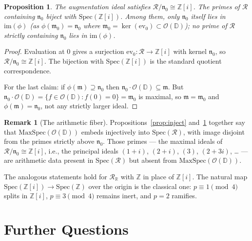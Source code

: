 \documentclass[12pt]{amsart}
\newtheorem{proposition}[theorem]{Proposition}
\theoremstyle{definition}
\newtheorem{remark}[theorem]{Remark}
\newcommand{\D}{\mathbb{D}}
\newcommand{\Z}{\mathbb{Z}}
\newcommand{\Zi}{\mathbb{Z}[i]}
\newcommand{\OD}{\mathcal{O}(\D)}
\newcommand{\mR}{\mathcal{R}}
\newcommand{\mRR}{\mathcal{R}_{\mathbb{R}}}
\begin{document}
\begin{proposition}
\label{prop:fiber}
The augmentation ideal satisfies $\mR/\mathfrak{n}_0 \cong \Zi$.  The
primes of $\mR$ containing $\mathfrak{n}_0$ biject with
$\mathrm{Spec}(\Zi)$.  Among them, only $\mathfrak{n}_0$ itself lies
in $\mathrm{im}(\phi)$ (as $\phi(\mathfrak{m}_0) = \mathfrak{n}_0$
where $\mathfrak{m}_0 = \ker(\mathrm{ev}_0) \subset \OD$); no prime
of $\mR$ strictly containing $\mathfrak{n}_0$ lies in $\mathrm{im}(\phi)$.
\end{proposition}

\begin{proof}
Evaluation at $0$ gives a surjection $\mathrm{ev}_0\colon\mR \to \Zi$
with kernel $\mathfrak{n}_0$, so $\mR/\mathfrak{n}_0 \cong \Zi$.  The
bijection with $\mathrm{Spec}(\Zi)$ is the standard quotient correspondence.

For the last claim: if $\phi(\mathfrak{m}) \supseteq \mathfrak{n}_0$
then $\mathfrak{n}_0 \cdot \OD \subseteq \mathfrak{m}$.  But
$\mathfrak{n}_0 \cdot \OD = \{f \in \OD : f(0)=0\} = \mathfrak{m}_0$
is maximal, so $\mathfrak{m} = \mathfrak{m}_0$ and
$\phi(\mathfrak{m}) = \mathfrak{n}_0$, not any strictly larger ideal.
\end{proof}

\begin{remark}[The arithmetic fiber]
\label{rem:fiber}
Propositions~\ref{prop:inject} and~\ref{prop:fiber} together say that
$\mathrm{MaxSpec}(\OD)$ embeds injectively into $\mathrm{Spec}(\mR)$,
with image disjoint from the primes strictly above $\mathfrak{n}_0$.
Those primes — the maximal ideals of $\mR/\mathfrak{n}_0 \cong \Zi$,
i.e., the principal ideals $(1+i)$, $(2+i)$, $(3)$, $(2+3i)$, \ldots
— are arithmetic data present in $\mathrm{Spec}(\mR)$ but absent from
$\mathrm{MaxSpec}(\OD)$.

The analogous statements hold for $\mRR$ with $\Z$ in place of $\Zi$.
The natural map $\mathrm{Spec}(\Zi) \to \mathrm{Spec}(\Z)$ over the
origin is the classical one: $p \equiv 1 \pmod{4}$ splits in $\Zi$,
$p \equiv 3 \pmod{4}$ remains inert, and $p=2$ ramifies.
\end{remark}

\section{Further Questions}
\label{sec:open}
\end{document}
